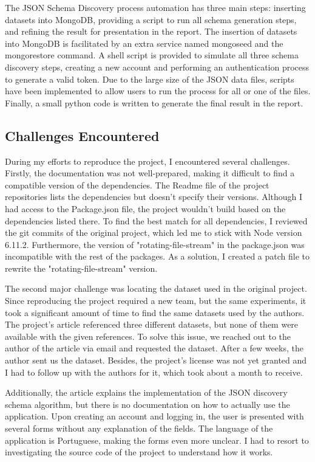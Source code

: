 \documentclass[sigconf]{acmart}
\begin{document}
The JSON Schema Discovery process automation has three main steps: inserting datasets into MongoDB, providing a script to run all schema generation steps, and refining the result for presentation in the report. The insertion of datasets into MongoDB is facilitated by an extra service named mongoseed and the mongorestore command. A shell script is provided to simulate all three schema discovery steps, creating a new account and performing an authentication process to generate a valid token. Due to the large size of the JSON data files, scripts have been implemented to allow users to run the process for all or one of the files. Finally, a small python code is written to generate the final result in the report.

\subsection{Challenges Encountered}

During my efforts to reproduce the project, I encountered several challenges. Firstly, the documentation was not well-prepared, making it difficult to find a compatible version of the dependencies. The Readme file of the project repositories lists the dependencies but doesn't specify their versions. Although I had access to the Package.json file, the project wouldn't build based on the dependencies listed there. To find the best match for all dependencies, I reviewed the git commits of the original project, which led me to stick with Node version 6.11.2. Furthermore, the version of "rotating-file-stream" in the package.json was incompatible with the rest of the packages. As a solution, I created a patch file to rewrite the "rotating-file-stream" version.

The second major challenge was locating the dataset used in the original project. Since reproducing the project required a new team, but the same experiments, it took a significant amount of time to find the same datasets used by the authors. The project's article referenced three different datasets, but none of them were available with the given references. To solve this issue, we reached out to the author of the article via email and requested the dataset. After a few weeks, the author sent us the dataset. Besides, the project's license was not yet granted and I had to follow up with the authors for it, which took about a month to receive.

Additionally, the article explains the implementation of the JSON discovery schema algorithm, but there is no documentation on how to actually use the application. Upon creating an account and logging in, the user is presented with several forms without any explanation of the fields. The language of the application is Portuguese, making the forms even more unclear. I had to resort to investigating the source code of the project to understand how it works.
\end{document}
